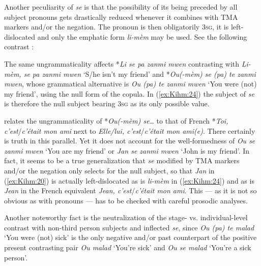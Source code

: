 \documentclass[output=paper]{langsci/langscibook}
\begin{document}
Another peculiarity of \emph{se} is that the possibility of its being
preceded by all subject pronouns gets drastically reduced whenever it
combines with TMA markers and/or the negation. The pronoun is then
obligatorily \textsc{3sg}, it is left-dislocated and only the emphatic
form \emph{li-mèm} may be used. See the following contrast %
\citep[151]{Deprez2003}%
%
:


\z

The same ungrammaticality affects *\emph{Li se pa zanmi mwen}
contrasting with \emph{Li-mèm, se pa zanmi mwen} `S/he isn't my friend'
and *\emph{Ou(-mèm) se (pa) te zanmi mwen}, whose grammatical
alternative is \emph{Ou (pa) te zanmi mwen} `You were (not) my friend',
using the null form of the copula. In (\ref{ex:Kihm:24}) the subject of \emph{se} is
therefore the null subject bearing \textsc{3sg} as its only possible
value.

%
\citet[151]{Deprez2003} %
%
relates the ungrammaticality of *\emph{Ou(-mèm)
se}\ldots{} to that of French *\emph{Toi, c'est}/\emph{c'était mon ami}
next to \emph{Elle/lui, c'est}/\emph{c'était mon ami(e)}. There
certainly is truth in this parallel. Yet it does not account for the
well-formedness of \emph{Ou se zanmi mwen} `You are my friend' or
\emph{Jan se zanmi mwen} `John is my friend'. In fact, it seems to be a
true generalization that \emph{se} modified by TMA markers and/or the
negation only selects for the null subject, so that \emph{Jan} in (\ref{ex:Kihm:20})
is actually left-dislocated as is \emph{li-mèm} in (\ref{ex:Kihm:24}) and as is
\emph{Jean} in the French equivalent \emph{Jean, c'est}/\emph{c'était
mon ami}. This --- as it is not so obvious as with pronouns --- has to
be checked with careful prosodic analyses.

Another noteworthy fact is the neutralization of the stage- vs.
individual-level contrast with non-third person subjects
and inflected \emph{se}, since \emph{Ou (pa) te malad} `You were (not)
sick' is the only negative and/or past counterpart of the positive
present contrasting pair \emph{Ou malad} `You're sick' and \emph{Ou se
malad} `You're a sick person'.
\end{document}
